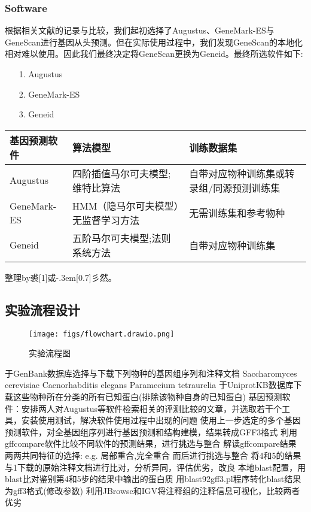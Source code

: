 \documentclass[12pt]{ctexart}
\newcommand{\yu}{\hbox{\scalebox{1}[1]{或}\kern-.3em\scalebox{0.3}[0.7]{彡}}}
\begin{document}
\subsubsection{Software}

根据相关文献\citep{10.1093/nar/gki937}的记录与比较，我们起初选择了Augustus、GeneMark-ES与GeneScan进行基因从头预测。但在实际使用过程中，我们发现GeneScan的本地化相对难以使用。因此我们最终决定将GeneScan更换为Geneid。最终所选软件如下:

\begin{itemize}
    \item [1.] Augustus
    \item [2.] GeneMark-ES
    \item [3.] Geneid
\end{itemize}

\begin{minipage}{\linewidth}
\centering
{} \label{tab:title} 
\begin{tabular}{ C{1.25in} C{1.85in} C{1.85in}}\toprule[1.5pt]
\textbf{基因预测软件} & \textbf{算法模型}  & \textbf{训练数据集}\\ \hline
Augustus & 四阶插值马尔可夫模型;维特比算法 & 自带对应物种训练集或转录组/同源预测训练集\\ 
GeneMark-ES & HMM（隐马尔可夫模型）无监督学习方法 & 无需训练集和参考物种 \\ 
Geneid & 五阶马尔可夫模型;法则系统方法 & 自带对应物种训练集 \\ 
\bottomrule[1.25pt]
\end {tabular}\par
\bigskip
\end{minipage}

整理by裘\yu 然。

\subsection{实验流程设计}

\begin{figure}[h!]
\centering
\texttt{[image: figs/flowchart.drawio.png]}
\caption{实验流程图}
\label{fig:任务流程图}
\end{figure}

\begin{outline}[enumerate]
 \1 于GenBank数据库选择与下载下列物种的基因组序列和注释文档
   \2 Saccharomyces cerevisiae
   \2 Caenorhabditis elegans
   \2 Paramecium tetraurelia
 \1 于UniprotKB数据库下载这些物种所在分类的所有已知蛋白(排除该物种自身的已知蛋白)
 \1 基因预测软件：安排两人对Augustus等软件检索相关的评测比较的文章，并选取若干个工具，安装使用测试，解决软件使用过程中出现的问题
 \1 使用上一步选定的多个基因预测软件，对全基因组序列进行基因预测和结构建模，结果转成GFF3格式
 \1 利用gffcompare软件比较不同软件的预测结果，进行挑选与整合
    \2 解读gffcompare结果
    \2  两两共同特征的选择: e.g. 局部重合,完全重合
    \2 而后进行挑选与整合
 \1 将4和5的结果与1下载的原始注释文档进行比对，分析异同，评估优劣，改良
 \1 本地blast配置，用blast比对鉴别第4和5步的结果中输出的蛋白质
 \1 用blast92gff3.pl程序转化blast结果为gff3格式(修改参数)
 \1 利用JBrowse和IGV将注释组的注释信息可视化，比较两者优劣
\end{outline}
   
\end{document}

